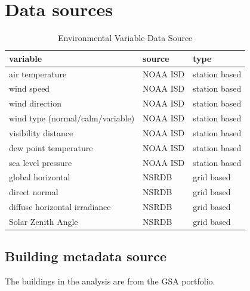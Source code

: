\documentclass[12pt]{article}
\begin{document}
\section{Data sources}
\begin{table}[h!]
\centering
\label{tab:data_source}
\begin{tabular}{l|l|l}
  \hline
variable                         & source & type          \\
  \hline
  \hline
air temperature                  & NOAA ISD  & station based \\
wind speed                       & NOAA ISD  & station based \\
wind direction                   & NOAA ISD  & station based \\
wind type (normal/calm/variable) & NOAA ISD  & station based \\
visibility distance              & NOAA ISD  & station based \\
dew point temperature            & NOAA ISD  & station based \\
sea level pressure               & NOAA ISD  & station based \\
global horizontal                & NSRDB  & grid based    \\
direct normal                    & NSRDB  & grid based    \\
diffuse horizontal irradiance    & NSRDB  & grid based    \\
Solar Zenith Angle               & NSRDB  & grid based   \\
  \hline
\end{tabular}
\caption{Environmental Variable Data Source}
\end{table}
\FloatBarrier
{}
\subsection{Building metadata source}
The buildings in the analysis are from the GSA portfolio.
\end{document}
